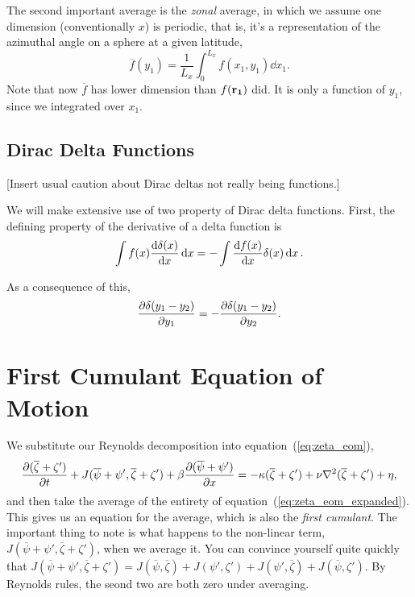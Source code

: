 \documentclass{paper}
\newcommand*{\reynolds}[1]{\mean{#1} + #1'}
\newcommand*{\mean}[1]{\overline{#1}}
\newcommand*{\zonal}[1]{\frac{1}{L_x} \int_0^{L_x} #1 \dd x_1}
\newcommand{\rr}[1]{\vb{r_{#1}}}
\begin{document}
The second important average is the \emph{zonal} average, in which we assume one dimension (conventionally $x$) is periodic, that is, it's a representation of the azimuthal angle on a sphere at a given latitude,
\begin{equation}
  \label{eq:zonal_average}
  \mean{f}(y_1) = \zonal{f(x_1, y_1)}. 
\end{equation}
Note that now $\mean{f}$ has lower dimension than $f(\rr1)$ did. It is only a function of $y_1$, since we integrated over $x_1$.

\subsection{Dirac Delta Functions}
\label{sec:dirac-delta-funct}

[Insert usual caution about Dirac deltas not really being functions.]

We will make extensive use of two property of Dirac delta functions. First, the defining property of the derivative of a delta function is
\begin{equation}
  \label{eq:dirac_derivative}
  \int f(x) \dv{\delta(x)}{x} \dd{x} = -\int \dv{f(x)}{x} \delta(x) \dd{x}.
\end{equation}

As a consequence of this,
\begin{equation}
  \label{eq:dirac_deriv_swap}
  \pdv{\delta(y_1 - y_2)}{y_1} = -\pdv{\delta(y_1 - y_2)}{y_2}.
\end{equation}

\section{First Cumulant Equation of Motion}
\label{sec:first-cumul-equat}

We substitute our Reynolds decomposition into equation~(\ref{eq:zeta_eom}),
\begin{equation}
  \label{eq:zeta_eom_expanded}
  \pdv{(\reynolds{\zeta})}{t} + J(\reynolds{\psi}, \reynolds{\zeta}) + \beta \pdv{(\reynolds{\psi})}{x} = -\kappa (\reynolds{\zeta}) + \nu \laplacian{(\reynolds{\zeta})} + \eta,
\end{equation}
and then take the average of the entirety of equation~(\ref{eq:zeta_eom_expanded}). This gives us an equation for the average, which is also the \emph{first cumulant}. The important thing to note is what happens to the non-linear term, $J(\reynolds{\psi}, \reynolds{\zeta})$, when we average it. You can convince yourself quite quickly that $J(\reynolds{\psi}, \reynolds{\zeta}) = J(\mean{\psi}, \mean{\zeta}) + J(\psi', \zeta') + J(\psi', \mean{\zeta}) + J(\mean{\psi}, \zeta')$. By Reynolds rules, the seond two are both zero under averaging.
\end{document}
